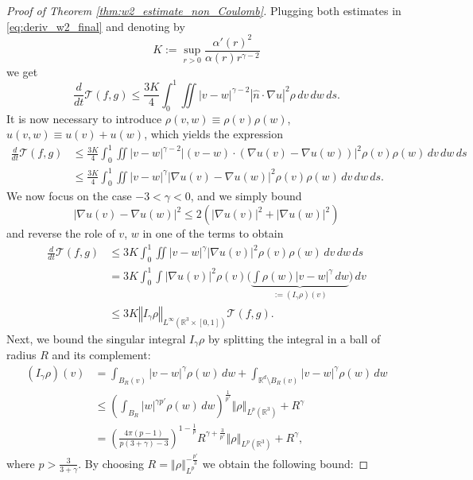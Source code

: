 \documentclass[11pt]{amsart}
\numberwithin{equation}{section}
\begin{document}
\begin{proof}[Proof of Theorem \ref{thm:w2_estimate_non_Coulomb}]
%
Plugging both estimates in \eqref{eq:deriv_w2_final} and denoting by
$$K:=\sup_{r>0}\frac{\alpha'(r)^2}{\alpha(r)r^{\gamma-2}}$$
we get 
%
\begin{equation*}
  \frac{d}{dt}\mathcal{T}(f,g)\leq\frac{3K}{4}\int_{0}^{1}\iint |v-w|^{\gamma-2}\left|\hat n\cdot\nabla u\right|^{2}\rho\,dv\,dw\,ds.
\end{equation*}
It is now  necessary to introduce $\rho(v,w)\equiv\rho(v)\rho(w)$, $u(v,w)\equiv u(v)+u(w)$, which yields the expression
%
\begin{align*}
  \frac{d}{dt}\mathcal{T}(f,g) & \leq\frac{3K}{4}\int_{0}^{1}\iint\left|v-w\right|^{\gamma-2}\left|(v-w)\cdot\left(\nabla u(v)-\nabla u(w)\right)\right|^{2}\rho(v)\rho(w)\,dv\,dw\,ds	\\
  & \leq\frac{3K}{4}\int_{0}^{1}\iint\left|v-w\right|^{\gamma}\left|\nabla u(v)-\nabla u(w)\right|^{2}\rho(v)\rho(w)\,dv\,dw\,ds.
\end{align*}
%
We now focus on the case $-3<\gamma<0$, and we simply bound  
$$\left|\nabla u(v)-\nabla u(w)\right|^{2}\leq2\left(\left|\nabla u(v)\right|^{2}+\left|\nabla u(w)\right|^{2}\right)$$
and reverse the role of $v$, $w$ in one of the terms to obtain
%
\begin{align*}
  \frac{d}{dt}\mathcal{T}(f,g) & \leq3K\int_{0}^{1}\iint\left|v-w\right|^{\gamma}\left|\nabla u(v)\right|^{2}\rho(v)\rho(w)\,dv\,dw\,ds	\\
  & =3K\int_{0}^{1}\int\left|\nabla u(v)\right|^{2}\rho(v)\bigg(\underbrace{\int\rho(w)\left|v-w\right|^{\gamma}\,dw}_{:=(I_{\gamma}\rho)(v)}\bigg)\,dv\\
  & \leq3K\left\Vert I_{\gamma}\rho\right\Vert _{L^{\infty}\left(\mathbb{R}^{3}\times[0,1]\right)}\mathcal{T}(f,g).
\end{align*}
%
Next, we bound the singular integral $I_{\gamma}\rho$ by splitting the integral in a ball of radius $R$ and its complement:
%
\begin{align*}
  (I_{\gamma}\rho)(v) & =\int_{B_{R}(v)}\left|v-w\right|^{\gamma}\rho(w)\,dw+\int_{\mathbb{R}^{d}\setminus B_{R}(v)}\left|v-w\right|^{\gamma}\rho(w)\,dw	\\
  & \leq\left(\int_{B_{R}}\left|w\right|^{\gamma p'}\rho(w)\,dw\right)^{\frac{1}{p'}}\left\Vert \rho\right\Vert _{L^{p}(\mathbb{R}^{3})}+R^{\gamma}\\
  & =\left(\frac{4\pi(p-1)}{p(3+\gamma)-3}\right)^{1-\frac{1}{p}}R^{\gamma+\frac{3}{p'}}\left\Vert \rho\right\Vert _{L^{p}(\mathbb{R}^{3})}+R^{\gamma},
\end{align*}
%
where $p>\frac{3}{3+\gamma}$. By choosing $R=\left\Vert \rho\right\Vert _{L^{p}}^{-\frac{p'}{3}}$ we obtain the following bound:

\end{proof}
\end{document}
